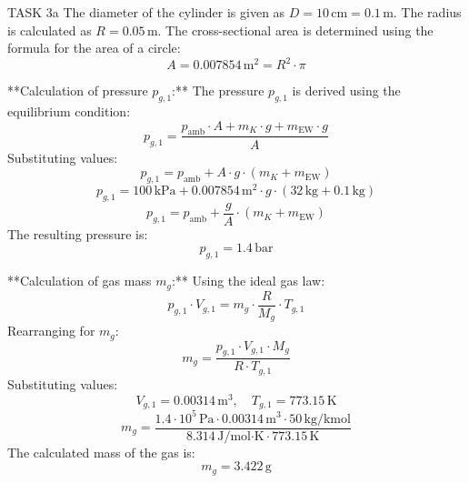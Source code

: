 TASK 3a  
The diameter of the cylinder is given as \( D = 10 \, \text{cm} = 0.1 \, \text{m} \).  
The radius is calculated as \( R = 0.05 \, \text{m} \).  
The cross-sectional area is determined using the formula for the area of a circle:  
\[
A = 0.007854 \, \text{m}^2 = R^2 \cdot \pi
\]

**Calculation of pressure \( p_{g,1} \):**  
The pressure \( p_{g,1} \) is derived using the equilibrium condition:  
\[
p_{g,1} = \frac{p_{\text{amb}} \cdot A + m_K \cdot g + m_{\text{EW}} \cdot g}{A}
\]  
Substituting values:  
\[
p_{g,1} = p_{\text{amb}} + A \cdot g \cdot (m_K + m_{\text{EW}})
\]  
\[
p_{g,1} = 100 \, \text{kPa} + 0.007854 \, \text{m}^2 \cdot g \cdot (32 \, \text{kg} + 0.1 \, \text{kg})
\]  
\[
p_{g,1} = p_{\text{amb}} + \frac{g}{A} \cdot (m_K + m_{\text{EW}})
\]  
The resulting pressure is:  
\[
p_{g,1} = 1.4 \, \text{bar}
\]

**Calculation of gas mass \( m_g \):**  
Using the ideal gas law:  
\[
p_{g,1} \cdot V_{g,1} = m_g \cdot \frac{R}{M_g} \cdot T_{g,1}
\]  
Rearranging for \( m_g \):  
\[
m_g = \frac{p_{g,1} \cdot V_{g,1} \cdot M_g}{R \cdot T_{g,1}}
\]  
Substituting values:  
\[
V_{g,1} = 0.00314 \, \text{m}^3, \quad T_{g,1} = 773.15 \, \text{K}
\]  
\[
m_g = \frac{1.4 \cdot 10^5 \, \text{Pa} \cdot 0.00314 \, \text{m}^3 \cdot 50 \, \text{kg/kmol}}{8.314 \, \text{J/mol·K} \cdot 773.15 \, \text{K}}
\]  
The calculated mass of the gas is:  
\[
m_g = 3.422 \, \text{g}
\]